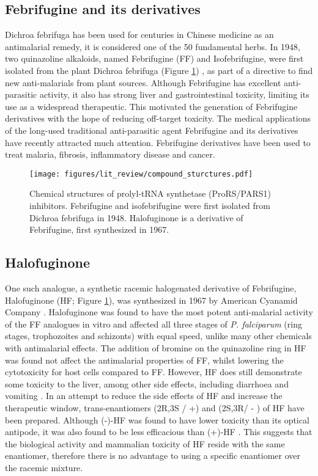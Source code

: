 \subsection{Febrifugine and its derivatives}\label{subsec:ff}
Dichroa febrifuga has been used for centuries in Chinese medicine as an antimalarial remedy, it is considered one of the 50 fundamental herbs.
In 1948, two quinazoline alkaloids, named Febrifugine (FF) and Isofebrifugine, were first isolated from the plant Dichroa febrifuga (Figure \ref{fig:FF_IF_HF}) \cite{koepfli1949alkaloids}, as part of a directive to find new anti-malarials from plant sources.
Although Febrifugine has excellent anti-parasitic activity, it also has strong liver and gastrointestinal toxicity, limiting its use as a widespread therapeutic.
This motivated the generation of Febrifugine derivatives with the hope of reducing off-target toxicity.
The medical applications of the long-used traditional anti-parasitic agent Febrifugine and its derivatives have recently attracted much attention.
Febrifugine derivatives have been used to treat malaria, fibrosis, inflammatory disease and cancer.

\begin{figure}[htb]
\centering
\texttt{[image: figures/lit\_review/compound\_sturctures.pdf]}
\caption[Prolyl-tRNA synthetase inhibitor chemical structures]{Chemical structures of prolyl-tRNA synthetase (ProRS/PARS1) inhibitors.
Febrifugine and isofebrifugine were first isolated from Dichroa febrifuga in 1948.
Halofuginone is a derivative of Febrifugine, first synthesized in 1967.
}
\label{fig:FF_IF_HF}\end{figure}

\subsection{Halofuginone}
One such analogue, a synthetic racemic halogenated derivative of Febrifugine, Halofuginone (HF; Figure \ref{fig:FF_IF_HF}), was synthesized in 1967 by American Cyanamid Company \cite{zhang2017novel}.
Halofuginone was found to have the most potent anti-malarial activity of the FF analogues in vitro and affected all three stages of \textit{P. falciparum} (ring stages, trophozoites and schizonts) with equal speed, unlike many other chemicals with antimalarial effects.
The addition of bromine on the quinazoline ring in HF was found not affect the antimalarial properties of FF, whilst lowering the cytotoxicity for host cells compared to FF.
However, HF does still demonstrate some toxicity to the liver, among other side effects, including diarrhoea and vomiting \cite{pines2015halofuginone}.
In an attempt to reduce the side effects of HF and increase the therapeutic window, trans-enantiomers (2R,3S / +)  and (2S,3R/ - ) of HF have been prepared.
Although (-)-HF was found to have lower toxicity than its optical antipode, it was also found to be less efficacious than (+)-HF \cite{mordechay2021differential, linder20072r}.
This suggests that the biological activity and mammalian toxicity of HF reside with the same enantiomer, therefore there is no advantage to using a specific enantiomer over the racemic mixture.

